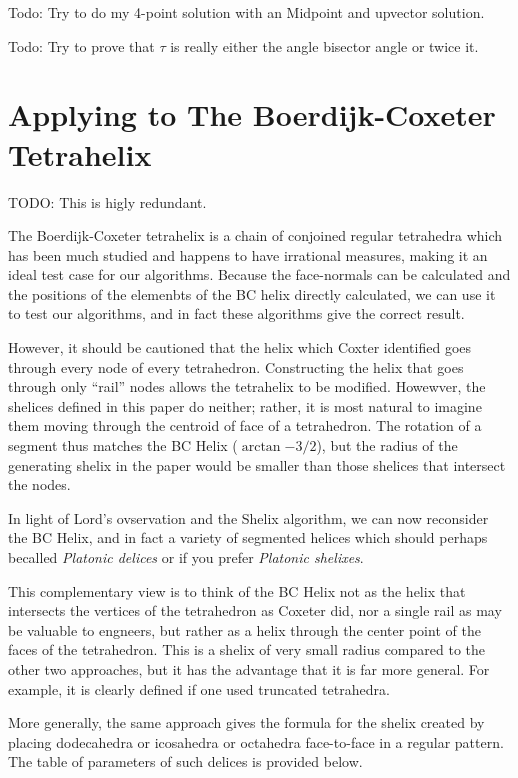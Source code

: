 \documentclass[11pt]{article}
\begin{document}
{Todo: Try to do my 4-point solution with an Midpoint and
upvector solution.

Todo: Try to prove that $\tau$ is really either the
angle bisector angle or twice it.


\section{Applying to The Boerdijk-Coxeter Tetrahelix}

TODO: This is higly redundant.

The Boerdijk-Coxeter tetrahelix is a chain of conjoined regular tetrahedra
which has been much studied\cite{coxeter1985simplicial,sadler2013periodic,fuller1982synergetics,read2018transforming} and happens to have irrational measures, making it an ideal
test case for our algorithms. Because the face-normals can be calculated and the
positions of the elemenbts of the BC helix directly calculated, we can use
it to test our algorithms, and in fact these algorithms give the correct result.

However, it should be cautioned that the helix which Coxter identified\cite{coxeter1985simplicial} goes through every node of every tetrahedron. Constructing the helix that goes
through only ``rail'' nodes allows the tetrahelix to be modified\cite{read2018transforming}.
Howewver, the shelices defined in this paper do neither; rather, it is most natural to
imagine them moving through the centroid of face of a tetrahedron. The rotation of a
segment thus matches the BC Helix ($\arctan{-3/2}$), but the radius of the
generating shelix in the paper would be smaller than those shelices that intersect the nodes.

In light of Lord's ovservation and the Shelix algorithm, we can now
reconsider the BC Helix, and in fact a variety of segmented helices which
should perhaps becalled {\em Platonic delices} or if you prefer {\em Platonic shelixes}.

This complementary view is to think of the BC Helix not as the helix that
intersects the vertices of the tetrahedron as Coxeter did\cite{coxeter1985simplicial}, nor a single
rail as may be valuable to engneers\cite{read2018transforming}, but rather as a helix through
the center point of the faces of the tetrahedron. This is a shelix of
very small radius compared to the other two approaches, but it has
the advantage that it is far more general. For example, it is
clearly defined if one used truncated tetrahedra.

More generally, the same approach gives the formula for the shelix
created by placing dodecahedra or icosahedra or octahedra face-to-face
in a regular pattern. The table of parameters of such delices is provided
below.

}
\end{document}
